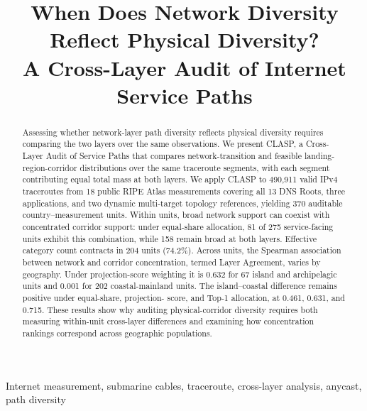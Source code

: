 \documentclass[10pt,conference,letterpaper]{IEEEtran}
\begin{document}
\title{When Does Network Diversity Reflect Physical Diversity?\\
A Cross-Layer Audit of Internet Service Paths}

\author{}

\maketitle

\begin{abstract}
Assessing whether network-layer path diversity reflects physical diversity
requires comparing the two layers over the same observations. We present
CLASP, a Cross-Layer Audit of Service Paths that compares network-transition
and feasible landing-region-corridor distributions over the same traceroute
segments, with each segment contributing equal total mass at both layers.
We apply CLASP to 490,911 valid IPv4 traceroutes from 18 public RIPE Atlas
measurements covering all 13 DNS Roots, three applications, and two
dynamic multi-target topology references, yielding 370 auditable
country--measurement units. Within units, broad network support can
coexist with concentrated corridor support: under equal-share allocation,
81 of 275 service-facing units exhibit this combination, while 158 remain
broad at both layers. Effective category count contracts in 204 units
(74.2\%). Across units, the Spearman association
between network and corridor concentration, termed Layer Agreement, varies
by geography. Under projection-score weighting it is 0.632 for 67 island
and archipelagic units and 0.001 for 202 coastal-mainland units. The
island--coastal difference remains positive under equal-share, projection-
score, and Top-1 allocation, at 0.461, 0.631, and 0.715. These results show
why auditing physical-corridor diversity requires both measuring
within-unit cross-layer differences and examining how concentration
rankings correspond across geographic populations.
\end{abstract}

\begin{IEEEkeywords}
Internet measurement, submarine cables, traceroute, cross-layer analysis,
anycast, path diversity
\end{IEEEkeywords}












\end{document}
